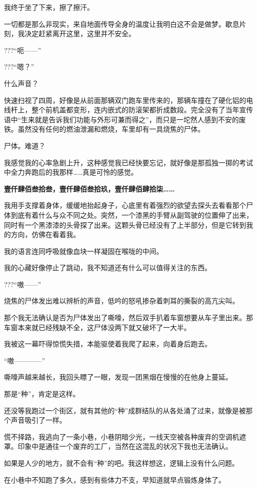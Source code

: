 我终于坐了下来，擦了擦汗。

一切都是那么非现实，来自地面传导全身的温度让我明白这不会是做梦。歇息片刻，我决定赶紧离开这里，这里并不安全。

???“呃——”

???“嗯？”

什么声音？

快速扫视了四周，好像是从前面那辆双门跑车里传来的，那辆车撞在了硬化铝的电线杆上，整个前机盖都变形，连内嵌式的防滚架都折成数段。完全没有了当年宣传语中“生来就是告诉我们功能与外形可兼而得之”，而只是一坨然人感到不安的废铁。虽然没有任何的燃油泄漏和燃烧，车里却有一具烧焦的尸体。

尸体。难道？

我感觉我的心率急剧上升，这种感觉我已经快要忘记，就好像是那孤独一掷的考试中全力奔跑后的我那样……真是可怜的感觉。

\textbf{壹仟肆佰叁拾叁，壹仟肆佰叁拾玖，壹仟肆佰肆拾柒……}

我用手支撑着身体，缓缓地抬起身子，心底里有着强烈的欲望去探头去看看那个尸体到底有着什么与众不同之处。突然，一个漆黑的手臂从副驾驶的位置伸了出来，同时有一个黑漆漆的头骨探了出来。这颗头骨已经没有了上半部分，但是它转到我的方向，仿佛在看着我。

我的语言连同呼吸就像血块一样凝固在喉咙的中间。

我的心藏好像停止了跳动，我不知道还有什么可以值得关注的东西。

???“嗷——”

烧焦的尸体发出难以辨析的声音，低吟的怒吼掺杂着刺耳的撕裂的高亢尖叫。

那个我无法确认是否为尸体发出了嘶嚎，然后双手扒着车窗想要从车子里出来。那车窗本来就已经残缺不全，这尸体没两下就又破坏了一大半。

我被这一幕吓得惊慌失措，本能驱使着我爬了起来，向着身后跑去。

“嗷————”

嘶嚎声越来越长，我回头瞟了一眼，发现一团黑烟在慢慢的在他身上蔓延。

那是“种”，肯定是这样。

还没等我跑过一个街区，就有其他的“种”成群结队的从各处涌了过来，就像是被那个声音吸引了一样。

慌不择路，我逃向了一条小巷，小巷阴暗少光，一线天空被各种废弃的空调机遮罩。印象中是通往一个废弃的工厂，当然在这混乱的状况下我也无法确认。

如果是人少的地方，就不会有“种”的吧。我这样想这，逻辑上没有什么问题。

在小巷中不知跑了多久，感到有些体力不支，早知道就早点锻炼身体了。

